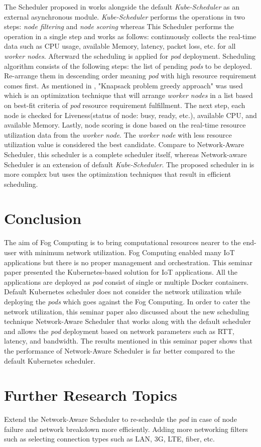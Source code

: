 The Scheduler proposed in \cite{8903766} works alongside the default \emph{Kube-Scheduler} as an external asynchronous module. \emph{Kube-Scheduler} performs the operations in two steps: \emph{node filtering} and \emph{node scoring} whereas This Scheduler\cite{8903766} performs the operation in a single step and works as follows: continuously collects the real-time data such as CPU usage, available Memory, latency, packet loss, etc.  for all \emph{worker nodes}. Afterward the scheduling is applied for \emph{pod} deployment. Scheduling algorithm consists of the following steps: the list of pending \emph{pods} to be deployed. Re-arrange them in descending order meaning \emph{pod} with high resource requirement comes first. As mentioned in \cite{8903766}, "Knapsack problem greedy approach" was used which is an optimization technique that will arrange \emph{worker nodes} in a list based on best-fit criteria of \emph{pod} resource requirement fulfillment. The next step, each node is checked for Liveness(status of node: busy, ready, etc.), available CPU, and available Memory\cite{8903766}. Lastly, node scoring is done based on the real-time resource utilization data from the \emph{worker node}. The \emph{worker node} with less resource utilization value is considered the best candidate\cite{8903766}. Compare to Network-Aware Scheduler\cite{Santos2019}, this scheduler\cite{8903766} is a complete scheduler itself, whereas Network-aware Scheduler\cite{Santos2019} is an extension of default \emph{Kube-Scheduler}. The proposed scheduler in \cite{8903766} is more complex but uses the optimization techniques that result in efficient scheduling.
\section{Conclusion}
\label{sec:concl}
The aim of Fog Computing is to bring computational resources nearer to the end-user with minimum network utilization. Fog Computing enabled many IoT applications but there is no proper management and orchestration. This seminar paper presented the Kubernetes-based solution for IoT applications. All the applications are deployed as \emph{pod} consist of single or multiple Docker containers. Default Kubernetes scheduler does not consider the network utilization while deploying the \emph{pods} which goes against the Fog Computing. In order to cater the network utilization, this seminar paper also discussed about the new scheduling technique Network-Aware Scheduler that works along with the default scheduler and allows the \emph{pod} deployment based on network parameters such as RTT, latency, and bandwidth. The results mentioned in this seminar paper shows that the performance of Network-Aware Scheduler is far better compared to the default Kubernetes scheduler.
\section{Further Research Topics}
\label{sec:research}
Extend the Network-Aware Scheduler to re-schedule the \emph{pod} in case of node failure and network breakdown more efficiently. Adding more networking filters such as selecting connection types such as LAN, 3G, LTE, fiber, etc.
